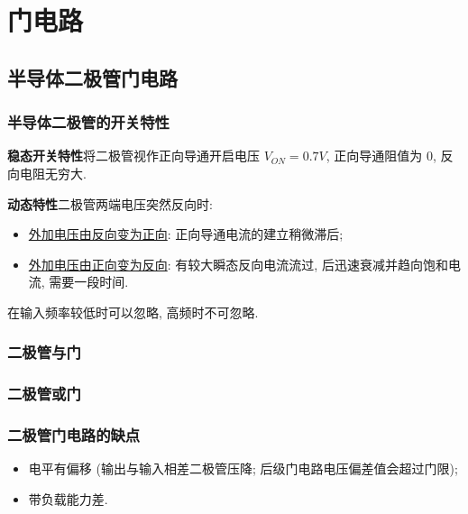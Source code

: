 \section{门电路}
\subsection{半导体二极管门电路}
\subsubsection{半导体二极管的开关特性} \label{3.1.1}
\textbf{稳态开关特性}\quad 将二极管视作正向导通开启电压 $V_{ON}=0.7 V$, 正向导通阻值为 0, 反向电阻无穷大.

\textbf{动态特性}\quad 二极管两端电压突然反向时:
\begin{itemize}
    \item \underline{外加电压由反向变为正向}: 正向导通电流的建立稍微滞后;
    \item \underline{外加电压由正向变为反向}: 有较大瞬态反向电流流过, 后迅速衰减并趋向饱和电流, 需要一段时间.
\end{itemize}

在输入频率较低时可以忽略, 高频时不可忽略.

\subsubsection{二极管与门}
\subsubsection{二极管或门}
\subsubsection{二极管门电路的缺点}
\begin{itemize}
    \item 电平有偏移 (输出与输入相差二极管压降; 后级门电路电压偏差值会超过门限);
    \item 带负载能力差.
\end{itemize}
